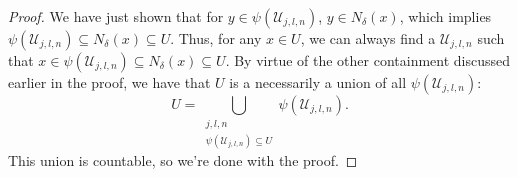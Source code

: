 \documentclass[11pt]{article}
\theoremstyle{theorem}
\begin{document}
\begin{proof}
We have just shown that for $y \in \psi(\mathcal{U}_{j,l,n})$, $y \in N_\delta(x)$, which implies $\psi(\mathcal{U}_{j,l,n}) \subseteq  N_\delta(x) \subseteq U$. Thus, for any $x\in U$, we can always find a $\mathcal{U}_{j,l,n}$ such that $x\in \psi(\mathcal{U}_{j,l,n}) \subseteq N_\delta(x) \subseteq U$. By virtue of the other containment discussed earlier in the proof, we have that $U$ is a necessarily a union of all $\psi(\mathcal{U}_{j,l,n})$:
\begin{equation*}
    U = \bigcup_{\substack{j,l,n \\ \psi(\mathcal{U}_{j,l,n}) \subseteq U}} \psi(\mathcal{U}_{j,l,n}).
\end{equation*}
This union is countable, so we're done with the proof. 


\end{proof}
\end{document}

